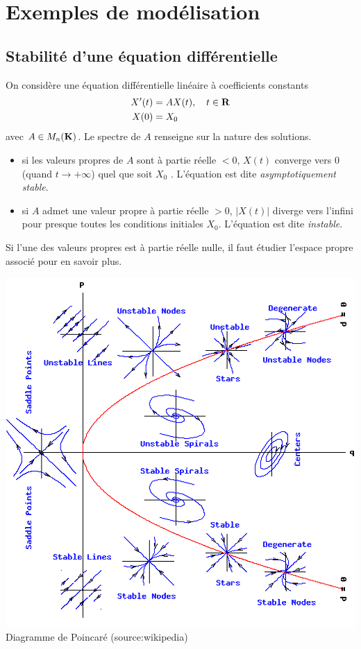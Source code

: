 \section{Exemples de modélisation}

\subsection{Stabilité d'une équation différentielle}
On considère une équation différentielle linéaire à coefficients constants
\begin{align*}
X'(t) & = AX(t), \quad t \in \mathbf{R} \\
X(0) & = X_0
\end{align*}
avec $A \in M_n(\mathbf{K})$. Le spectre de $A$ renseigne sur la nature des solutions.
\begin{itemize}
\item si les valeurs propres de $A$ sont à partie réelle $<0$, $X(t)$ converge vers 0 (quand $t\rightarrow +\infty$) quel que soit $X_0$ . L'équation est dite \emph{asymptotiquement stable}.
\item si $A$ admet une valeur propre à partie réelle $> 0$, $|X(t)|$ diverge vers l'infini pour presque toutes les conditions initiales $X_0$. L'équation est dite \emph{instable}.
\end{itemize}

\begin{remark}
Si l'une des valeurs propres est à partie réelle nulle, il faut étudier
l'espace propre associé pour en savoir plus.
\end{remark}

\begin{center}
	\includegraphics[width=0.57\linewidth]{flows2d.png}\\
	\scriptsize Diagramme de Poincaré (source:wikipedia)
\end{center}

